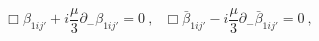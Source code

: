 \begin{equation}\label{dia5}
\Box \beta_{1ij'}
   + i \frac{\mu}{3} \partial_- \beta_{1ij'} = 0 ~,~~~
\Box \bar\beta_{1ij'}
   - i \frac{\mu}{3} \partial_- \bar\beta_{1ij'} = 0 ~,
\end{equation}

